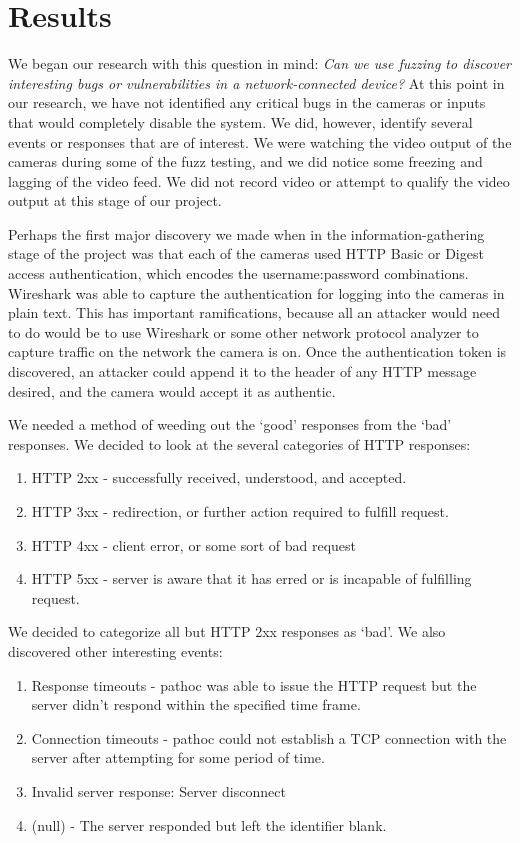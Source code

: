 \documentclass[letterpaper,twocolumn,10pt]{article}
\begin{document}
\section{Results}
We began our research with this question in mind: \textit{Can we use fuzzing to discover interesting bugs or vulnerabilities in a network-connected device?} At this point in our research, we have not identified any critical bugs in the cameras or inputs that would completely disable the system. We did, however, identify several events or responses that are of interest. We were watching the video output of the cameras during some of the fuzz testing, and we did notice some freezing and lagging of the video feed. We did not record video or attempt to qualify the video output at this stage of our project. 

Perhaps the first major discovery we made when in the information-gathering stage of the project was that each of the cameras used HTTP Basic or Digest access authentication, which encodes the username:password combinations. Wireshark was able to capture the authentication for logging into the cameras in plain text. This has important ramifications, because all an attacker would need to do would be to use Wireshark or some other network protocol analyzer to capture traffic on the network the camera is on. Once the authentication token is discovered, an attacker could append it to the header of any HTTP message desired, and the camera would accept it as authentic. 

We needed a method of weeding out the `good' responses from the `bad' responses. We decided to look at the several categories of HTTP responses: 
\begin{enumerate}
\item HTTP 2xx - successfully received, understood, and accepted.
\item HTTP 3xx - redirection, or further action required to fulfill request.
\item HTTP 4xx - client error, or some sort of bad request
\item HTTP 5xx - server is aware that it has erred or is incapable of fulfilling request.
\end{enumerate}
We decided to categorize all but HTTP 2xx responses as `bad'. We also discovered other interesting events:
\begin{enumerate}
	\item Response timeouts - pathoc was able to issue the HTTP request but the server didn't respond within the specified time frame.
	\item Connection timeouts - pathoc could not establish a TCP connection with the server after attempting for some period of time.
	\item Invalid server response: Server disconnect
	\item (null) - The server responded but left the identifier blank.
\end{enumerate}
\end{document}
